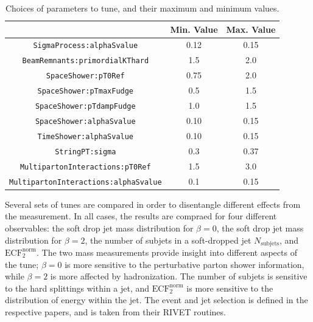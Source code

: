 \begin{table}[ht!]
\caption{Choices of parameters to tune, and their maximum and minimum values.}
\centering\begin{tabular}{ | c | | c | c | } \hline
                                     & Min. Value   & Max. Value    \\ \hline
\texttt{SigmaProcess:alphaSvalue}             &  0.12        & 0.15    \\ \hline
\texttt{BeamRemnants:primordialKThard}        &  1.5         & 2.0     \\ \hline
\texttt{SpaceShower:pT0Ref}                   &  0.75        & 2.0     \\ \hline
\texttt{SpaceShower:pTmaxFudge}               &  0.5         & 1.5     \\ \hline
\texttt{SpaceShower:pTdampFudge}              &  1.0         & 1.5     \\ \hline
\texttt{SpaceShower:alphaSvalue}              &  0.10        & 0.15    \\ \hline
\texttt{TimeShower:alphaSvalue}               &  0.10        & 0.15    \\ \hline
\texttt{StringPT:sigma}                       &  0.3         & 0.37    \\ \hline
\texttt{MultipartonInteractions:pT0Ref}       &  1.5         & 3.0     \\ \hline
\texttt{MultipartonInteractions:alphaSvalue}  &  0.1         & 0.15    \\ \hline
\end{tabular}
\label{tab:parameterSpace}
\end{table}

Several sets of tunes are compared in order to disentangle different effects from the measurement. In all cases, the results are compraed for four different observables:
the soft drop jet mass distribution for $\beta=0$, the soft drop jet mass distribution for $\beta=2$, the number of subjets in a soft-dropped jet $N_{\mathrm{subjets}}$, and $\mathrm{ECF}_2^{\mathrm{norm}}$.
The two mass measurements provide insight into different aspects of the tune; $\beta=0$ is more sensitive to the perturbative parton shower information, 
while $\beta=2$ is more affected by hadronization. The number of subjets is sensitive to the hard splittings within a jet, and $\mathrm{ECF}_2^{\mathrm{norm}}$ is more sensitive to the 
distribution of energy within the jet. The event and jet selection is defined in the respective papers, and is taken from their RIVET routines.

